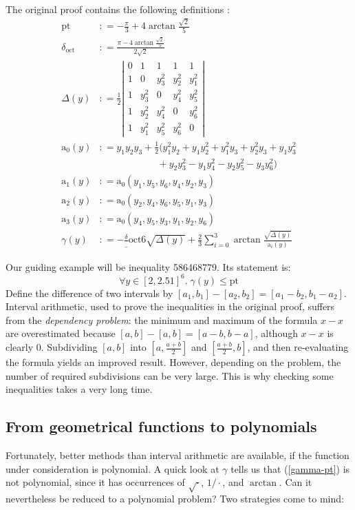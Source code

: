 \documentclass[11pt]{amsart}
\def\coloneq{\mathrel{\mathop:}=}
\def\sfrac#1#2{{\textstyle \frac {#1} {#2}}}
\def\eqref#1{(\ref{#1})}
\def\pt{\mathrm{pt}}
\def\doct{\delta_{\mathrm{oct}}}
\def\asolid{\mathrm{a}}
\begin{document}
The original proof contains the following definitions \cite{sp1}:
\begin{align*}
  \pt &\coloneq - \frac \pi 3 + 4 \arctan \frac{\sqrt 2}5 \\
\doct &\coloneq \frac {\pi - 4 \arctan \frac{\sqrt 2}5}{2 \sqrt 2}\\
\Delta(y) &\coloneq \frac 1 2
  \left|
  \begin{array}{ccccc}
0 & 1 & 1 & 1 & 1 \\
   1 & 0 & y_3^2 & y_2^2 & y_1^2 \\
   1 & y_3^2 & 0 & y_4^2 & y_5^2 \\
   1 & y_2^2 & y_4^2 & 0 & y_6^2 \\
   1 & y_1^2 & y_5^2 & y_6^2 & 0
  \end{array}
  \right|\\
\asolid_0(y) &\coloneq y_1 y_2 y_3 + \sfrac 1 2 (
y_1^2 y_2 + y_1 y_2^2 + y_1^2 y_3 + y_2^2 y_3 + y_1 y_3^2 \\
&\qquad\qquad\qquad {} + y_2 y_3^2 - y_1 y_4^2 - y_2 y_5^2 - y_3 y_6^2)\\
\asolid_1(y) &\coloneq \asolid_0 (y_1, y_5, y_6, y_4, y_2, y_3)\\
\asolid_2(y) &\coloneq \asolid_0 (y_2, y_4, y_6, y_5, y_1, y_3)\\
\asolid_3(y) &\coloneq \asolid_0 (y_4, y_5, y_3, y_1, y_2, y_6)\\
\gamma(y) &\coloneq 
- \frac \doct 6 \sqrt {\Delta(y)} + \frac 2 3 \sum_{i=0}^3 \arctan \frac
{\sqrt{\Delta(y)}} {\asolid_i(y)}
\end{align*}

Our guiding example will be inequality 586468779. Its statement is:
\begin{equation}
\forall y \in [2,2.51]^6.\; \gamma(y) \le \pt \label{gamma-pt}
\end{equation}
Define the difference of two intervals by $[a_1,b_1]-[a_2,b_2] = [a_1-b_2,b_1-a_2]$.
Interval arithmetic, used to prove the inequalities in the original proof,
suffers from the \emph{dependency problem}: the minimum and maximum of the
formula $x-x$ are overestimated because $[a,b] - [a,b] = [a-b,b-a]$, although
$x-x$ is clearly $0$. Subdividing $[a,b]$ into $[a,\sfrac{a+b}2]$ and
$[\sfrac{a+b}2,b]$, and then re-evaluating the formula yields an improved
result. However, depending on the problem, the number of required subdivisions
can be very large. This is why checking some inequalities takes a very long
time.

\subsection*{From geometrical functions to polynomials}
Fortunately, better methods than interval arithmetic are available, if the
function under consideration is polynomial. A quick look at $\gamma$ tells us
that \eqref{gamma-pt} is not polynomial, since it has occurrences of
$\sqrt\cdot$, $1/\cdot$, and $\arctan$. Can it nevertheless be reduced
to a polynomial problem? Two strategies come to mind:
\end{document}
